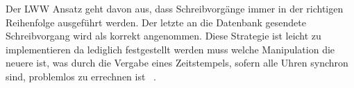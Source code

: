 Der \gls{LWW} Ansatz geht davon aus, dass Schreibvorgänge immer in der richtigen Reihenfolge ausgeführt werden. Der letzte an die Datenbank gesendete Schreibvorgang wird als korrekt angenommen.
Diese Strategie ist leicht zu implementieren da lediglich festgestellt werden muss welche Manipulation die neuere ist, was durch die Vergabe eines Zeitstempels, sofern alle Uhren synchron sind, problemlos zu errechnen ist ~\cite{lww}.
